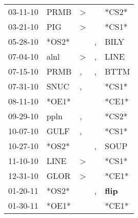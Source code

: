 \begin{supertabular}{p{0.07\textwidth}p{0.06\textwidth}p{0.02\textwidth}p{0.02\textwidth}p{0.06\textwidth}}
          03-11-10\textsuperscript{} &           PRMB\textsuperscript{} &     \textgreater &                  &                            *CS2* \\
          03-21-10\textsuperscript{} &            PIG\textsuperscript{} &     \textgreater &                  &                            *CS1* \\
          05-28-10\textsuperscript{} &                            *OS2* &                  &                , &           BILY\textsuperscript{} \\
          07-04-10\textsuperscript{} &           alnl\textsuperscript{} &     \textgreater &                , &           LINE\textsuperscript{} \\
          07-15-10\textsuperscript{} &           PRMB\textsuperscript{} &                , &                , &           BTTM\textsuperscript{} \\
          07-31-10\textsuperscript{} &           SNUC\textsuperscript{} &                , &                  &                            *CS1* \\
          08-11-10\textsuperscript{} &                            *OE1* &                  &                  &                            *CE1* \\
          09-29-10\textsuperscript{} &           ppln\textsuperscript{} &                , &                  &                            *CS2* \\
          10-07-10\textsuperscript{} &           GULF\textsuperscript{} &                , &                  &                            *CS1* \\
          10-27-10\textsuperscript{} &                            *OS2* &                  &                , &           SOUP\textsuperscript{} \\
          11-10-10\textsuperscript{} &           LINE\textsuperscript{} &     \textgreater &                  &                            *CS1* \\
          12-31-10\textsuperscript{} &           GLOR\textsuperscript{} &     \textgreater &                  &                            *CE1* \\
          01-20-11\textsuperscript{} &                            *OS2* &                  &                , &  \textbf{flip\textsuperscript{}} \\
          01-30-11\textsuperscript{} &                            *OE1* &                  &                  &                            *CE1* \\

\end{supertabular}
